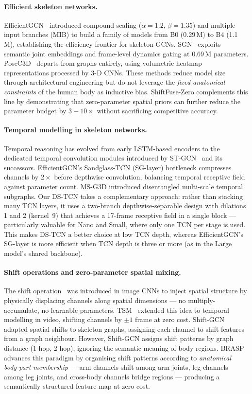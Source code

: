 \documentclass[sigconf,screen,review,anonymous]{acmart}
\begin{document}
\paragraph{Efficient skeleton networks.}
EfficientGCN~\cite{efficientgcn} introduced compound scaling
($\alpha{=}1.2$, $\beta{=}1.35$) and multiple input branches (MIB) to
build a family of models from B0 (0.29\,M) to B4 (1.1\,M), establishing
the efficiency frontier for skeleton GCNs.
SGN~\cite{sgn} exploits semantic joint embeddings and frame-level
dynamics gating at 0.69\,M parameters.
PoseC3D~\cite{posec3d} departs from graphs entirely, using volumetric
heatmap representations processed by 3-D CNNs.
These methods reduce model size through architectural engineering but
do not leverage the \emph{fixed anatomical constraints} of the human
body as inductive bias.
ShiftFuse-Zero complements this line by demonstrating that zero-parameter
spatial priors can further reduce the parameter budget by $3{-}10{\times}$
without sacrificing competitive accuracy.

\paragraph{Temporal modelling in skeleton networks.}
Temporal reasoning has evolved from early LSTM-based encoders to
the dedicated temporal convolution modules introduced by
ST-GCN~\cite{stgcn} and its successors.
EfficientGCN's Sandglass-TCN (SG-layer) bottleneck
compresses channels by $2\times$ before depthwise convolution,
balancing temporal receptive field against parameter count.
MS-G3D introduced disentangled multi-scale temporal subgraphs.
Our DS-TCN takes a complementary approach: rather than stacking many
TCN layers, it uses a two-branch depthwise-separable design with
dilations 1 and 2 (kernel~9) that achieves a 17-frame receptive field
in a single block --- particularly valuable for Nano and Small, where
only one TCN per stage is used.
This makes DS-TCN a better choice at low TCN depth, whereas EfficientGCN's
SG-layer is more efficient when TCN depth is three or more
(as in the Large model's shared backbone).

\paragraph{Shift operations and zero-parameter spatial mixing.}
The shift operation~\cite{shiftcnn} was introduced in image CNNs to inject
spatial structure by physically displacing channels along spatial
dimensions --- no multiply-accumulate, no learnable parameters.
TSM~\cite{tsm} extended this idea to temporal modelling in video, shifting
channels by $\pm 1$ frame at zero cost.
Shift-GCN~\cite{shiftgcn} adapted spatial shifts to skeleton graphs,
assigning each channel to shift features from a graph neighbour.
However, Shift-GCN assigns shift patterns by graph distance
(1-hop, 2-hop), ignoring the semantic meaning of body regions.
BRASP advances this paradigm by organising shift patterns according to
\emph{anatomical body-part membership} --- arm channels shift among arm
joints, leg channels among leg joints, and cross-body channels bridge
regions --- producing a semantically structured feature map at zero cost.
\end{document}
